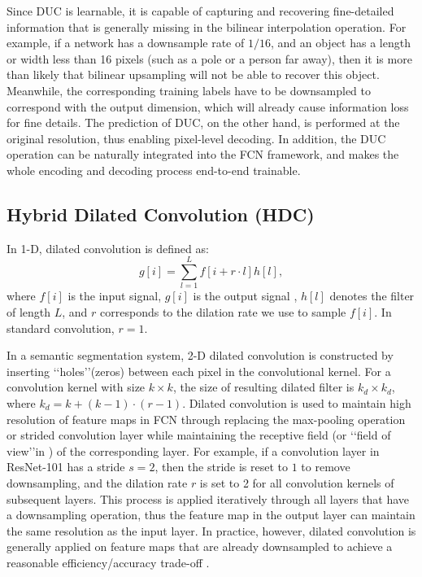 \documentclass[10pt,twocolumn,letterpaper]{article}
\begin{document}
Since DUC is learnable, it is capable of capturing and recovering fine-detailed information that is generally missing in the bilinear interpolation operation. For example, if a network has a downsample rate of $1/16$, and an object has a length or width less than 16 pixels (such as a pole or a person far away), then it is more than likely that bilinear upsampling will not be able to recover this object. Meanwhile, the corresponding training labels have to be downsampled to correspond with the output dimension, which will already cause information loss for fine details. The prediction of DUC, on the other hand, is performed at the original resolution, thus enabling pixel-level decoding. In addition, the DUC operation can be naturally integrated into the FCN framework, and makes the whole encoding and decoding process end-to-end trainable.

\subsection{Hybrid Dilated Convolution (HDC)}
In 1-D, dilated convolution is defined as:
\begin{equation}
g[i]=\sum_{l=1}^{L}f[i+r\cdot l]h[l],
\end{equation}
where $f[i]$ is the input signal, $g[i]$ is the output signal , $h[l]$ denotes the filter of length $L$, and $r$ corresponds to the dilation rate we use to sample $f[i]$. In standard convolution, $r=1$.

In a semantic segmentation system, 2-D dilated convolution is constructed by inserting \lq\lq holes\rq\rq (zeros) between each pixel in the convolutional kernel. For a convolution kernel with size $k\times{k}$, the size of resulting dilated filter is $k_d\times{k_d}$, where $k_d=k+(k-1)\cdot(r-1)$. Dilated convolution is used to maintain high resolution of feature maps in FCN through replacing the max-pooling operation or strided convolution layer while maintaining the receptive field (or \lq\lq field of view\rq\rq in \cite{chen2016deeplab}) of the corresponding layer. For example, if a convolution layer in ResNet-101 has a stride $s=2$, then the stride is reset to $1$ to remove downsampling, and the dilation rate $r$ is set to 2 for all convolution kernels of subsequent layers. This process is applied iteratively through all layers that have a downsampling operation, thus the feature map in the output layer can maintain the same resolution as the input layer. In practice, however, dilated convolution is generally applied on feature maps that are already downsampled to achieve a reasonable efficiency/accuracy trade-off \cite{chen2016deeplab}. 
\end{document}
